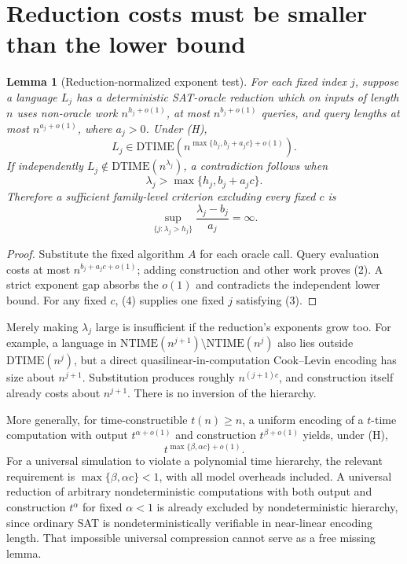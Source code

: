 \documentclass[11pt]{article}
\newtheorem{lemma}{Lemma}
\begin{document}
\section{Reduction costs must be smaller than the lower bound}
\begin{lemma}[Reduction-normalized exponent test]
For each fixed index $j$, suppose a language $L_j$ has a deterministic
SAT-oracle reduction which on inputs of length $n$ uses non-oracle work
$n^{h_j+o(1)}$, at most $n^{b_j+o(1)}$ queries, and query lengths at most
$n^{a_j+o(1)}$, where $a_j>0$. Under (H),
\[
 L_j\in\mathrm{DTIME}
 \left(n^{\max\{h_j,b_j+a_jc\}+o(1)}\right).
 \tag{2}
\]
If independently $L_j\notin\mathrm{DTIME}(n^{\lambda_j})$, a contradiction
follows when
\[
 \lambda_j>\max\{h_j,b_j+a_jc\}.
 \tag{3}
\]
Therefore a sufficient family-level criterion excluding every fixed $c$ is
\[
 \sup_{\{j:\lambda_j>h_j\}}
 \frac{\lambda_j-b_j}{a_j}=\infty.
 \tag{4}
\]
\end{lemma}
\begin{proof}
Substitute the fixed algorithm $A$ for each oracle call. Query evaluation costs
at most $n^{b_j+a_jc+o(1)}$; adding construction and other work proves (2).
A strict exponent gap absorbs the $o(1)$ and contradicts the independent
lower bound. For any fixed $c$, (4) supplies one fixed $j$ satisfying (3).
\end{proof}

Merely making $\lambda_j$ large is insufficient if the reduction's exponents
grow too. For example, a language in
$\mathrm{NTIME}(n^{j+1})\setminus\mathrm{NTIME}(n^j)$ also lies outside
$\mathrm{DTIME}(n^j)$, but a direct quasilinear-in-computation Cook--Levin
encoding has size about $n^{j+1}$. Substitution produces roughly
$n^{(j+1)c}$, and construction itself already costs about $n^{j+1}$.
There is no inversion of the hierarchy.

More generally, for time-constructible $t(n)\ge n$, a uniform encoding of a $t$-time computation with output
$t^{\alpha+o(1)}$ and construction $t^{\beta+o(1)}$ yields, under (H),
\[
 t^{\max\{\beta,\alpha c\}+o(1)}.
 \tag{5}
\]
For a universal simulation to violate a polynomial time hierarchy, the
relevant requirement is $\max\{\beta,\alpha c\}<1$, with all model overheads
included. A universal reduction of arbitrary nondeterministic computations
with both output and construction $t^\alpha$ for fixed $\alpha<1$ is already
excluded by nondeterministic hierarchy, since ordinary SAT is
nondeterministically verifiable in near-linear encoding length.
That impossible universal compression cannot serve as a free missing lemma.
\end{document}

